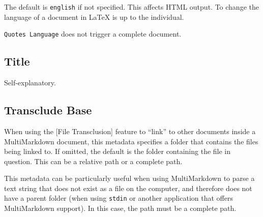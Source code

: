 The default is \texttt{english} if not specified. This affects HTML output. To
change the language of a document in LaTeX is up to the individual.

\texttt{Quotes Language} does not trigger a complete document.

\subsection{Title }
\label{title}

Self-explanatory.

\subsection{Transclude Base }
\label{transcludebase}

When using the {[File Transclusion]} feature to ``link'' to other documents inside a MultiMarkdown document, this metadata specifies a folder that contains the files being linked to. If omitted, the default is the folder containing the file in question. This can be a relative path or a complete path.

This metadata can be particularly useful when using MultiMarkdown to parse a text string that does not exist as a file on the computer, and therefore does not have a parent folder (when using \texttt{stdin} or another application that offers MultiMarkdown support). In this case, the path must be a complete path.



